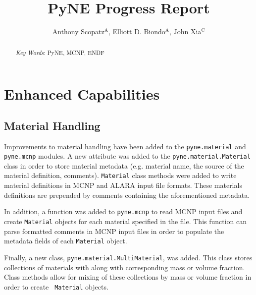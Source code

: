 \documentclass{ansconf}
\newcommand{\superscript}[1]{\ensuremath{^{\textrm{#1}}}}
\begin{document}
\title{PyNE Progress Report}

\author{Anthony Scopatz\superscript{A}, Elliott D. Biondo\superscript{A}, 
        John Xia\superscript{C}}

\maketitle

\begin{abstract}
\raggedright

\emph{Key Words}: PyNE, MCNP, ENDF
\end{abstract}

\setlength{\baselineskip}{12pt}


\section{Enhanced Capabilities}

\subsection{Material Handling}

Improvements to material handling have been added to the \texttt{pyne.material}
and \texttt{pyne.mcnp} modules. A new attribute was added to the
\texttt{pyne.material.Material} class in order to store material metadata (e.g.
material name, the source of the material definition, comments).
\texttt{Material} class methods were added to write material definitions in MCNP
and ALARA \cite{wilson_alara:_1999} input file formats.  These materials
definitions are prepended by comments containing the aforementioned metadata. 

In addition, a function was added to \texttt{pyne.mcnp} to read MCNP input files and
create \texttt{Material} objects for each material specified in the file. This
function can parse formatted comments in MCNP input files in order to
populate the metadata fields of each \texttt{Material} object.

Finally, a new class, \texttt{pyne.material.MultiMaterial}, was added.  This
class stores collections of materials with along with corresponding mass or
volume fraction.  Class methods allow for mixing of these collections by mass
or volume fraction in order to create \texttt{ Material} objects.
\end{document}
